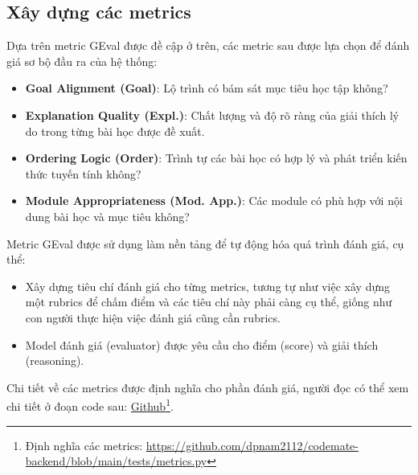 \subsection{Xây dựng các metrics}
Dựa trên metric GEval được đề cập ở trên, các metric sau được lựa chọn để đánh giá sơ bộ đầu ra của hệ thống:
\begin{itemize}
    \item \textbf{Goal Alignment (Goal)}: Lộ trình có bám sát mục tiêu học tập không?
    \item \textbf{Explanation Quality (Expl.)}: Chất lượng và độ rõ ràng của giải thích lý do trong từng bài học được đề xuất.
    \item \textbf{Ordering Logic (Order)}: Trình tự các bài học có hợp lý và phát triển kiến thức tuyến tính không?
    \item \textbf{Module Appropriateness (Mod. App.)}: Các module có phù hợp với nội dung bài học và mục tiêu không?
\end{itemize}

Metric GEval được sử dụng làm nền tảng để tự động hóa quá trình đánh giá, cụ thể:
\begin{itemize}
    \item Xây dựng tiêu chí đánh giá cho từng metrics, tương tự như việc xây dựng một rubrics để chấm điểm và các tiêu chí này phải càng cụ thể, giống như con người thực hiện việc đánh giá cũng cần rubrics.
    \item Model đánh giá (evaluator) được yêu cầu cho điểm (score) và giải thích (reasoning).
\end{itemize}
Chi tiết về các metrics được định nghĩa cho phần đánh giá, người đọc có thể xem chi tiết ở đoạn code sau: \href{https://github.com/dpnam2112/codemate-backend/blob/main/tests/metrics.py}{Github}\footnote{Định nghĩa các metrics: \url{https://github.com/dpnam2112/codemate-backend/blob/main/tests/metrics.py}}.

